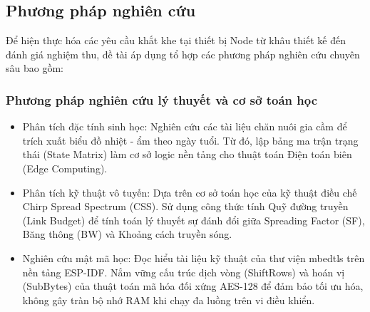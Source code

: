 \subsection{Phương pháp nghiên cứu}
Để hiện thực hóa các yêu cầu khắt khe tại thiết bị Node từ khâu thiết kế đến đánh giá nghiệm thu, đề tài áp dụng tổ hợp các phương pháp nghiên cứu chuyên sâu bao gồm:
\subsubsection{Phương pháp nghiên cứu lý thuyết và cơ sở toán học}
\begin{itemize}
    \item Phân tích đặc tính sinh học: Nghiên cứu các tài liệu chăn nuôi gia cầm để trích xuất biểu đồ nhiệt - ẩm theo ngày tuổi. Từ đó, lập bảng ma trận trạng thái (State Matrix) làm cơ sở logic nền tảng cho thuật toán Điện toán biên (Edge Computing).
    \item Phân tích kỹ thuật vô tuyến: Dựa trên cơ sở toán học của kỹ thuật điều chế Chirp Spread Spectrum (CSS). Sử dụng công thức tính Quỹ đường truyền (Link Budget) để tính toán lý thuyết sự đánh đổi giữa Spreading Factor (SF), Băng thông (BW) và Khoảng cách truyền sóng.
    \item Nghiên cứu mật mã học: Đọc hiểu tài liệu kỹ thuật của thư viện mbedtls trên nền tảng ESP-IDF. Nắm vững cấu trúc dịch vòng (ShiftRows) và hoán vị (SubBytes) của thuật toán mã hóa đối xứng AES-128 để đảm bảo tối ưu hóa, không gây tràn bộ nhớ RAM khi chạy đa luồng trên vi điều khiển.
\end{itemize}

